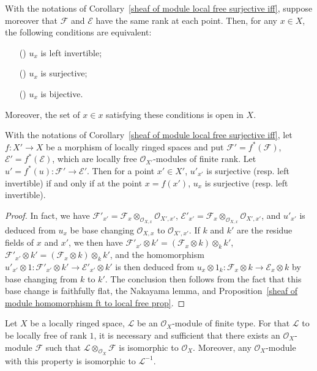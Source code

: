 \begin{corollary}\label{sheaf of module local free same rank inj iff bij}
With the notations of Corollary~\ref{sheaf of module local free surjective iff}, suppose moreover that $\mathscr{F}$ and $\mathscr{E}$ have the same rank at each point. Then, for any $x\in X$, the following conditions are equivalent:
\begin{itemize}
\item[(\rmnum{1})] $u_x$ is left invertible;
\item[(\rmnum{2})] $u_x$ is surjective;
\item[(\rmnum{3})] $u_x$ is bijective.
\end{itemize}
Moreover, the set of $x\in x$ satisfying these conditions is open in $X$.
\end{corollary}
\begin{corollary}\label{sheaf of module local free same rank sur of inverse image}
With the notations of Corollary~\ref{sheaf of module local free surjective iff}, let $f:X'\to X$ be a morphism of locally ringed spaces and put $\mathscr{F}'=f^*(\mathscr{F})$, $\mathscr{E}'=f^*(\mathscr{E})$, which are locally free $\mathscr{O}_{X'}$-modules of finite rank. Let $u'=f^*(u):\mathscr{F}'\to\mathscr{E}'$. Then for a point $x'\in X'$, $u'_{x'}$ is surjective (resp. left invertible) if and only if at the point $x=f(x')$, $u_x$ is surjective (resp. left invertible).
\end{corollary}
\begin{proof}
In fact, we have $\mathscr{F}'_{x'}=\mathscr{F}_x\otimes_{\mathscr{O}_{X,x}}\mathscr{O}_{X',x'}$, $\mathscr{E}'_{x'}=\mathscr{F}_x\otimes_{\mathscr{O}_{X,x}}\mathscr{O}_{X',x'}$, and $u'_{x'}$ is deduced from $u_x$ be base changing $\mathscr{O}_{X,x}$ to $\mathscr{O}_{X',x'}$. If $k$ and $k'$ are the residue fields of $x$ and $x'$, we then have $\mathscr{F}'_{x'}\otimes k'=(\mathscr{F}_x\otimes k)\otimes_kk'$, $\mathscr{F}'_{x'}\otimes k'=(\mathscr{F}_x\otimes k)\otimes_kk'$, and the homomorphism $u'_{x'}\otimes 1:\mathscr{F}'_{x'}\otimes k'\to\mathscr{E}'_{x'}\otimes k'$ is then deduced from $u_x\otimes 1_k:\mathscr{F}_x\otimes k\to\mathscr{E}_x\otimes k$ by base changing from $k$ to $k'$. The conclusion then follows from the fact that this base change is faithfully flat, the Nakayama lemma, and Proposition~\ref{sheaf of module homomorphism ft to local free prop}. 
\end{proof}
\begin{proposition}\label{sheaf of module local rank 1 iff invertible}
Let $X$ be a locally ringed space, $\mathscr{L}$ be an $\mathscr{O}_X$-module of finite type. For that $\mathscr{L}$ to be locally free of rank $1$, it is necessary and sufficient that there exists an $\mathscr{O}_X$-module $\mathscr{F}$ such that $\mathscr{L}\otimes_{\mathscr{O}_X}\mathscr{F}$ is isomorphic to $\mathscr{O}_X$. Moreover, any $\mathscr{O}_X$-module with this property is isomorphic to $\mathscr{L}^{-1}$.
\end{proposition}
